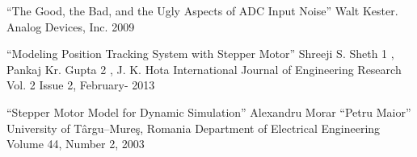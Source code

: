 \begin{thebibliography}{20}
     ``The Good, the Bad, and the Ugly Aspects of ADC Input Noise''
                                        Walt Kester. Analog Devices, Inc. 2009

     ``Modeling Position Tracking System with Stepper Motor''
                                                Shreeji S. Sheth 1 , Pankaj Kr. Gupta 2 , J. K. Hota
                                                International Journal of Engineering Research
                                                Vol. 2 Issue 2, February- 2013

     ``Stepper Motor Model for Dynamic Simulation''
                                                            Alexandru Morar
                                                            “Petru Maior” University of Târgu–Mureş,
                                                            Romania Department of Electrical Engineering
                                                            Volume 44, Number 2, 2003

\end{thebibliography}

\endinput

